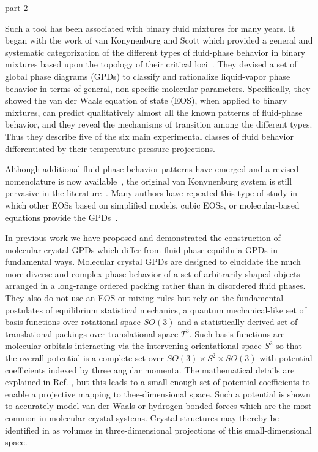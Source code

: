 \documentclass[preprint]{revtex4}
\begin{document}

part 2

Such a tool has been associated with binary fluid mixtures for many years.  It began with the work of van Konynenburg and Scott which provided a general and systematic categorization of the different types of fluid-phase behavior in binary mixtures based upon the topology of their critical loci~\cite{vanKonynenburg80}.  They devised a set of global phase diagrams (GPDs) to classify and rationalize liquid-vapor phase behavior in terms of general, non-specific molecular parameters.   Specifically, they showed the van der Waals equation of state (EOS), when applied to binary mixtures, can predict qualitatively almost all the known patterns of fluid-phase behavior, and they reveal the mechanisms of transition among the different types.  Thus they describe five of the six main experimental classes of fluid behavior differentiated by their temperature-pressure projections.

Although additional fluid-phase behavior patterns have emerged and a revised nomenclature is now available~\cite{Bolz98}, the original van Konynenburg system is still pervasive in the literature~\cite{AparicioMartinez07a,AparicioMartinez07b,Cismondi07}. Many authors have repeated this type of study in which other EOSs based on simplified models, cubic EOSs, or molecular-based equations provide the GPDs~\cite{Polishuk00,Polishuk02,vanPelt95}.


In previous work we have proposed and demonstrated the construction of molecular crystal GPDs which differ from fluid-phase equilibria GPDs in fundamental ways.  Molecular crystal GPDs are designed to elucidate the much more diverse and complex phase behavior of a set of arbitrarily-shaped objects arranged in a long-range ordered packing rather than in disordered fluid phases.  They also do not use an EOS or mixing rules but rely on the fundamental postulates of equilibrium statistical mechanics, a quantum mechanical-like set of basis functions over rotational space $SO(3)$ and a statistically-derived set of translational packings over translational space $T^3$.  Such basis functions are molecular orbitals interacting via the intervening orientational space $S^2$ so that the overall potential is a complete set over $SO(3) \times S^2 \times SO(3)$ with potential coefficients indexed by three angular momenta.  The mathematical details are explained in Ref. \cite{Mettes04}, but this leads to a small enough set of potential coefficients to enable a projective mapping to thee-dimensional space.  Such a potential is shown to accurately model van der Waals or hydrogen-bonded forces which are the most common in molecular crystal systems\cite{Mettes04}. Crystal structures may thereby be identified in as volumes in three-dimensional projections of this small-dimensional space. 
\end{document}

